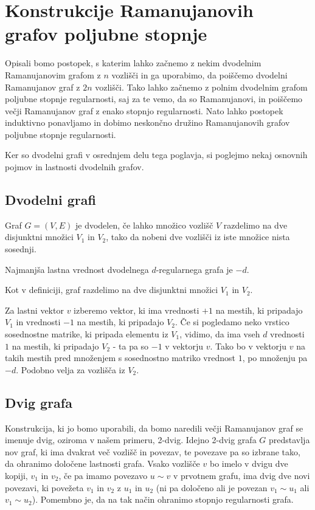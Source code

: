 \section{Konstrukcije Ramanujanovih grafov poljubne stopnje}
Opisali bomo postopek, s katerim lahko začnemo z nekim dvodelnim Ramanujanovim grafom z \(n\) vozlišči in ga uporabimo, da poiščemo dvodelni Ramanujanov graf z \(2n\) vozlišči. Tako lahko začnemo z polnim dvodelnim grafom poljubne stopnje regularnosti, saj za te vemo, da so Ramanujanovi, in poiščemo večji Ramanujanov graf z enako stopnjo regularnosti. Nato lahko postopek induktivno ponavljamo in dobimo neskončno družino Ramanujanovih grafov poljubne stopnje regularnosti\cite{marcus2014interlacingfamiliesibipartite}.

Ker so dvodelni grafi v osrednjem delu tega poglavja, si poglejmo nekaj osnovnih pojmov in lastnosti dvodelnih grafov.
\subsection{Dvodelni grafi}
\begin{definicija}
    Graf \(G = (V, E)\) je dvodelen, če lahko množico vozlišč \(V\) razdelimo na dve disjunktni množici \(V_1\) in \(V_2\), tako da nobeni dve vozlišči iz iste množice nista sosednji.
\end{definicija}

\begin{izrek}
    Najmanjša lastna vrednost dvodelnega \(d\)-regularnega grafa je \(-d\).
\end{izrek}
\begin{dokaz}
    Kot v definiciji, graf razdelimo na dve disjunktni množici \(V_1\) in \(V_2\).

    Za lastni vektor \(v\) izberemo vektor, ki ima vrednosti \(+1\) na mestih, ki pripadajo \(V_1\) in vrednosti \(-1\) na mestih, ki pripadajo \(V_2\). Če si pogledamo neko vrstico sosednostne matrike, ki pripada elementu iz \(V_1\), vidimo, da ima vseh \(d\) vrednosti \(1\) na mestih, ki pripadajo \(V_2\) - ta pa so \(-1\) v vektorju \(v\). Tako bo v vektorju \(v\) na takih mestih pred množenjem s sosednostno matriko vrednost \(1\), po množenju pa \(-d\). Podobno velja za vozlišča iz \(V_2\).
\end{dokaz}

\subsection{Dvig grafa}
Konstrukcija, ki jo bomo uporabili, da bomo naredili večji Ramanujanov graf se imenuje dvig, oziroma v našem primeru, 2-dvig. Idejno 2-dvig grafa \(G\) predstavlja nov graf, ki ima dvakrat več vozlišč in povezav, te povezave pa so izbrane tako, da ohranimo določene lastnosti grafa. Vsako vozlišče \(v\) bo imelo v dvigu dve kopiji, \(v_1\) in \(v_2\), če pa imamo povezavo \(u\sim v\) v prvotnem grafu, ima dvig dve novi povezavi, ki povežeta \(v_1\) in \(v_2\) z \(u_1\) in \(u_2\) (ni pa določeno ali je povezan \(v_1\sim u_1\) ali \(v_1\sim u_2\)). Pomembno je, da na tak način ohranimo stopnjo regularnosti grafa.


